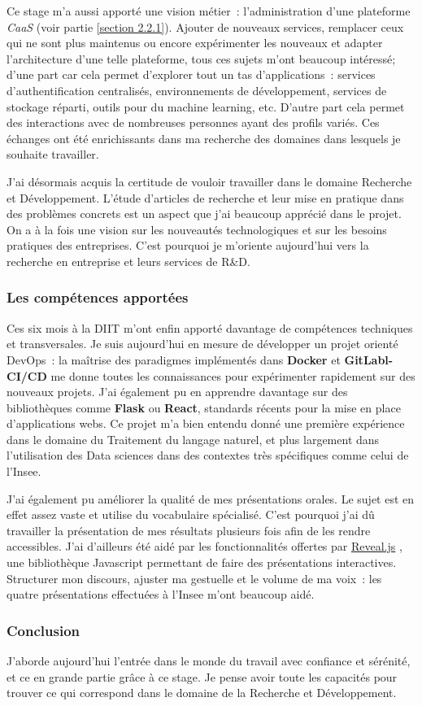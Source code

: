 Ce stage m'a aussi apporté une vision métier~: l'administration d'une plateforme \textit{CaaS} (voir partie \ref{section 2.2.1}). Ajouter de nouveaux services, remplacer ceux qui ne sont plus maintenus ou encore expérimenter les nouveaux et adapter l'architecture d'une telle plateforme, tous ces sujets m'ont beaucoup intéressé; d'une part car cela permet d'explorer tout un tas d'applications~: services d'authentification centralisés, environnements de développement, services de stockage réparti, outils pour du machine learning, etc. D'autre part cela permet des interactions avec de nombreuses personnes ayant des profils variés. Ces échanges ont été enrichissants dans ma recherche des domaines dans lesquels je souhaite travailler.  
\newline

J'ai désormais acquis la certitude de vouloir travailler dans le domaine Recherche et Développement. L'étude d'articles de recherche et leur mise en pratique dans des problèmes concrets est un aspect que j'ai beaucoup apprécié dans le projet. On a à la fois une vision sur les nouveautés technologiques et sur les besoins pratiques des entreprises. C'est pourquoi je m'oriente aujourd'hui vers la recherche en entreprise et leurs services de R\&D.
\newline

\subsubsection{Les compétences apportées}

Ces six mois à la DIIT m'ont enfin apporté davantage de compétences techniques et transversales. Je suis aujourd'hui en mesure de développer un projet orienté DevOps~: la maîtrise des paradigmes implémentés dans \textbf{Docker} et \textbf{GitLabl-CI/CD} me donne toutes les connaissances pour expérimenter rapidement sur des nouveaux projets. J'ai également pu en apprendre davantage sur des bibliothèques comme \textbf{Flask} ou \textbf{React}, standards récents pour la mise en place d'applications webs. Ce projet m'a bien entendu donné une première expérience dans le domaine du Traitement du langage naturel, et plus largement dans l'utilisation des Data sciences dans des contextes très spécifiques comme celui de l'Insee.
\newline

J'ai également pu améliorer la qualité de mes présentations orales. Le sujet est en effet assez vaste et utilise du vocabulaire spécialisé. C'est pourquoi j'ai dû travailler la présentation de mes résultats plusieurs fois afin de les rendre accessibles. J'ai d'ailleurs été aidé par les fonctionnalités offertes par \href{https://revealjs.com}{Reveal.js} \cite{}, une bibliothèque Javascript permettant de faire des présentations interactives. Structurer mon discours, ajuster ma gestuelle et le volume de ma voix~: les quatre présentations effectuées à l'Insee m'ont beaucoup aidé.
\newline

\subsubsection*{Conclusion}

J'aborde aujourd'hui l'entrée dans le monde du travail avec confiance et sérénité, et ce en grande partie grâce à ce stage. Je pense avoir toute les capacités pour trouver ce qui correspond dans le domaine de la Recherche et Développement.
